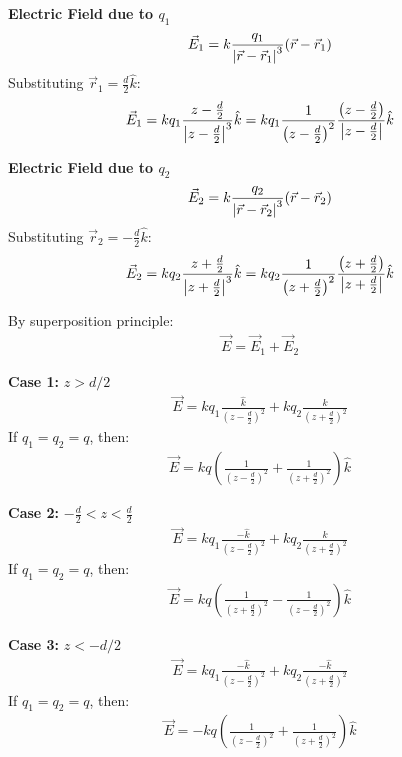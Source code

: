 \documentclass[12pt]{article}
\providecommand{\brak}[1]{\ensuremath{\left(#1\right)}}
\begin{document}
\textbf{Electric Field due to $q_1$}
\begin{align*}
\vec{E}_1 = k \frac{q_1}{\abs{\vec{r} - \vec{r}_1}^3} (\vec{r} - \vec{r}_1)
\end{align*}
Substituting $\vec{r}_1 = \frac{d}{2} \hat{k}$:
\begin{align*}
    \vec{E}_1 = k q_1 \frac{z - \frac{d}{2}}{\abs{z - \frac{d}{2}}^3} \hat{k}= k q_1 \frac{1}{\brak{z - \frac{d}{2}}^2} \frac{\brak{z - \frac{d}{2}}}{\abs{z - \frac{d}{2}}} \hat{k}
\end{align*}

\textbf{Electric Field due to $q_2$}
\begin{align*}
\vec{E}_2 = k \frac{q_2}{\abs{\vec{r} - \vec{r}_2}^3} (\vec{r} - \vec{r}_2)
\end{align*}
Substituting $\vec{r}_2 = -\frac{d}{2} \hat{k}$:
\begin{align*}
    \vec{E}_2 = k q_2 \frac{z + \frac{d}{2}}{\abs{z + \frac{d}{2}}^3} \hat{k} = k q_2 \frac{1}{\brak{z + \frac{d}{2}}^2} \frac{\brak{z + \frac{d}{2}}}{\abs{z + \frac{d}{2}}} \hat{k}
\end{align*}

By superposition principle:
\begin{align*}
    \vec{E} = \vec{E}_1 + \vec{E}_2
\end{align*}

\textbf{Case 1:} $z > d/2$
\begin{align*}
\vec{E} = k q_1 \frac{\hat{k}}{\brak{z - \frac{d}{2}}^2} + k q_2 \frac{\hat{k}}{\brak{z + \frac{d}{2}}^2}
\end{align*}
If $q_1 = q_2 = q$, then:
\begin{align*}
\vec{E} = k q \brak{\frac{1}{\brak{z - \frac{d}{2}}^2} + \frac{1}{\brak{z + \frac{d}{2}}^2}} \hat{k}
\end{align*}


\textbf{Case 2:} $-\frac{d}{2} < z < \frac{d}{2}$
\begin{align*}
\vec{E} = k q_1 \frac{-\hat{k}}{\brak{z - \frac{d}{2}}^2} + k q_2 \frac{\hat{k}}{\brak{z + \frac{d}{2}}^2}
\end{align*}
If $q_1 = q_2 = q$, then:
\begin{align*}
\vec{E} = k q \brak{\frac{1}{\brak{z + \frac{d}{2}}^2} - \frac{1}{\brak{z - \frac{d}{2}}^2}} \hat{k}
\end{align*}

\textbf{Case 3:} $z < -d/2$
\begin{align*}
\vec{E} = k q_1 \frac{-\hat{k}}{\brak{z - \frac{d}{2}}^2} + k q_2 \frac{-\hat{k}}{\brak{z + \frac{d}{2}}^2}
\end{align*}
If $q_1 = q_2 = q$, then:
\begin{align*}
\vec{E} = -k q \brak{\frac{1}{\brak{z - \frac{d}{2}}^2} + \frac{1}{\brak{z + \frac{d}{2}}^2}} \hat{k}
\end{align*}
\end{document}
